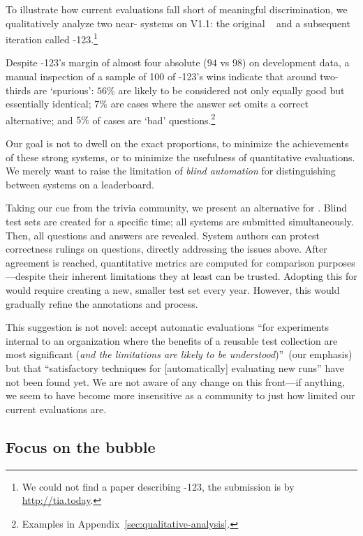 To illustrate how current evaluations fall short of meaningful
discrimination, we qualitatively analyze two near-\sota{} systems on
\squad{} V1.1: the original \xlnet{}~\citep{yang-19} and a subsequent
iteration called \xlnet{}-123.\footnote{We could not find a paper
  describing \xlnet{}-123, the submission is by
  \url{http://tia.today}.}

Despite \xlnet{}-123's margin of almost four absolute \fone{} ($94$ vs
$98$) on development data, a manual inspection of a sample of 100 of
\xlnet{}-123's wins indicate that around two-thirds are `spurious':
$56\%$ are likely to be considered not only equally good but
essentially identical; $7\%$ are cases where the answer set omits a
correct alternative; and $5\%$ of cases are `bad'
questions.\footnote{Examples in
  Appendix~\ref{sec:qualitative-analysis}.}

Our goal is not to dwell on the exact proportions, to minimize the achievements of these strong systems, or to minimize the usefulness of quantitative evaluations.
We merely want to raise the limitation of \emph{blind automation} for distinguishing between
systems on a leaderboard. 

Taking our cue from the trivia community, we present an alternative
for .
Blind test sets are created for a specific time; all systems are submitted simultaneously.
Then, all questions and answers are revealed.
System authors can protest correctness rulings on questions, directly
addressing the issues above. 
After agreement is reached,
quantitative metrics are computed for comparison purposes---despite their inherent limitations they at least can be
trusted.
Adopting this for  would require creating a new, smaller test
set every year.
However, this would gradually refine the annotations and process.

This suggestion is not novel: \citet{voorhees-00} accept automatic
evaluations ``for experiments internal to an organization where the
benefits of a reusable test collection are most significant (\emph{and
  the limitations are likely to be understood})''~(our emphasis) but
that ``satisfactory techniques for [automatically] evaluating new
runs'' have not been found yet.  We are not aware of any change on
this front---if anything, we seem to have become more insensitive as a
community to just how limited our current evaluations are.

\subsection{Focus on the bubble}

